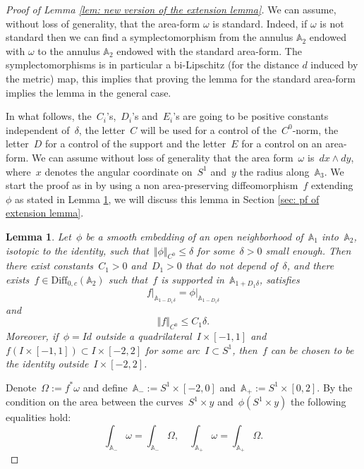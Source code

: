 \documentclass[10pt]{amsart}
\newtheorem{lemma}[prop]{Lemma}
\begin{document}
\begin{proof}[Proof of Lemma \ref{lem: new version of the extension lemma}]
We can assume, without loss of generality, that the area-form $\omega$ is standard. Indeed, if $\omega$ is not standard then we can find a symplectomorphism from the annulus $\mathbb A_2$ endowed with $\omega$ to the annulus $\mathbb A_2$ endowed with the standard area-form. The symplectomorphisms is in particular a bi-Lipschitz (for the distance $d$ induced by the metric) map, this implies that proving the lemma for the standard area-form implies the lemma in the general case.	
	
In what follows, the~$C_i$'s,~$D_i$'s and~$E_i$'s are going to be positive constants independent of~$\delta$, the letter~$C$ will be used for a control of the~$C^0$-norm, the letter~$D$ for a control of the support and the letter~$E$ for a control on an area-form. We can assume without loss of generality that the area form~$\omega$ is~$dx\wedge dy$, where~$x$ denotes the angular coordinate on~$S^1$ and~$y$ the radius along~$\mathbb{A}_3$. We start the proof as in \cite{EPP} by using a non area-preserving diffeomorphism~$f$ extending~$\phi$ as stated in Lemma \ref{lem: smooth extension}, we will discuss this lemma in Section \ref{sec: pf of extension lemma}.

\begin{lemma}\label{lem: smooth extension}
Let~$\phi$ be a smooth embedding of an open neighborhood of~$\mathbb{A}_1$ into~$\mathbb{A}_2$, isotopic to the identity, such that~$\Vert \phi \Vert_{C^0}  \leq \delta$ for some~$\delta>0$ small enough. Then there exist constants~$C_1>0$ and~$D_1>0$ that do not depend of~$\delta$, and there exists~$f\in \text{Diff}_{0,c}\left(\mathbb{A}_{2}\right)$ such that~$f$ is supported in~$\mathbb{A}_{1+D_1\delta}$, satisfies
$$f\vert_{\mathbb{A}_{1-D_1\delta}}=\phi\vert_{\mathbb{A}_{1-D_1\delta}}$$
and
$$\Vert f \Vert_{C^0}\leq C_1\delta.$$
Moreover, if~$\phi=Id$ outside a quadrilateral~$I\times [-1,1]$ and~$f(I\times [-1,1])\subset I\times [-2,2]$ for some arc~$I\subset S^1$, then~$f$ can be chosen to be the identity outside~$I \times [-2,2]$.
\end{lemma}

Denote~$\Omega:= f^*\omega$ and define~$\mathbb{A}_-:=S^1\times [-2,0]$ and~$\mathbb{A}_+:=S^1\times [0,2]$. By the condition on the area between the curves~$S^1\times y$ and~$\phi(S^1 \times y)$ the following equalities hold:
$$\int_{\mathbb{A}_-}\omega = \int_{\mathbb{A}_-}\Omega,\quad \int_{\mathbb{A}_+}\omega = \int_{\mathbb{A}_+}\Omega.$$


\end{proof}
\end{document}

